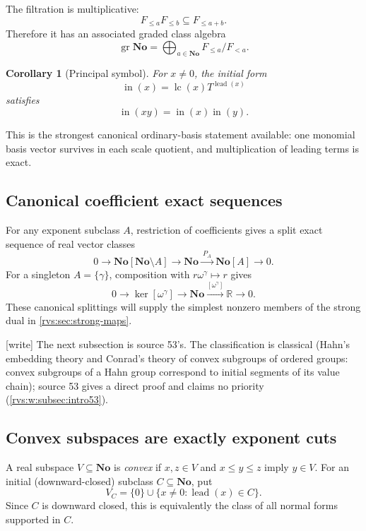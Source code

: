 \documentclass[11pt,letterpaper]{article}
\numberwithin{equation}{section}
\newtheorem{corollary}[theorem]{Corollary}
\theoremstyle{definition}
\theoremstyle{remark}
\newcommand{\No}{\mathbf{No}}
\newcommand{\R}{\mathbb{R}}
\newcommand{\lead}{\operatorname{lead}}
\newcommand{\gr}{\operatorname{gr}}
\newcommand{\lc}{\operatorname{lc}}
\newcommand{\wtag}{\textup{[write]}}%
\begin{document}
The filtration is multiplicative:
\[
  F_{\le a}F_{\le b}\subseteq F_{\le a+b}.
\]
Therefore it has an associated graded class algebra
\[
  \gr\No=\bigoplus_{a\in\No}F_{\le a}/F_{<a}.
\]
\begin{corollary}[Principal symbol]
For $x\ne0$, the initial form
\[
  \operatorname{in}(x)=\lc(x)T^{\lead(x)}
\]
satisfies
\[
  \operatorname{in}(xy)=\operatorname{in}(x)\operatorname{in}(y).
\]
\end{corollary}

This is the strongest canonical ordinary-basis statement available: one monomial
basis vector survives in each scale quotient, and multiplication of leading terms
is exact.
\subsection{Canonical coefficient exact sequences}

For any exponent subclass \(A\), restriction of coefficients gives a split
exact sequence of real vector classes
\begin{equation}\label{rvs:eq:split-exact-A}
  0\longrightarrow \No[\No\setminus A]
  \longrightarrow \No
  \xrightarrow{\ P_A\ } \No[A]
  \longrightarrow0.
\end{equation}
For a singleton \(A=\{\gamma\}\), composition with
\(r\omega^\gamma\mapsto r\) gives
\begin{equation}\label{rvs:eq:coord-exact}
  0\longrightarrow\ker[\omega^\gamma]
  \longrightarrow\No
  \xrightarrow{[\omega^\gamma]}\R
  \longrightarrow0.
\end{equation}
These canonical splittings will supply the simplest nonzero members of the
strong dual in \cref{rvs:sec:strong-maps}.

\noindent\wtag{} The next subsection is source 53's.  The classification
is classical (Hahn's embedding theory and Conrad's theory of convex
subgroups of ordered groups: convex subgroups of a Hahn group correspond to
initial segments of its value chain); source 53 gives a direct proof and
claims no priority (\cref{rvs:w:subsec:intro53}).

\subsection{Convex subspaces are exactly exponent cuts}

A real subspace $V\subseteq\No$ is \emph{convex} if $x,z\in V$ and
$x\le y\le z$ imply $y\in V$. For an initial (downward-closed) subclass
$C\subseteq\No$, put
\[
  V_C=\{0\}\cup\{x\ne0:\lead(x)\in C\}.
\]
Since $C$ is downward closed, this is equivalently the class of all normal forms
supported in $C$.
\end{document}
